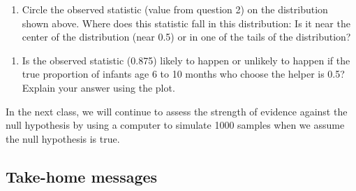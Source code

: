 \documentclass[
]{report}
\providecommand{\tightlist}{%
  \setlength{\itemsep}{0pt}\setlength{\parskip}{0pt}}
\begin{document}
\begin{enumerate}
\def\labelenumi{\arabic{enumi}.}
\setcounter{enumi}{16}
\tightlist
\item
  Circle the observed statistic (value from question 2) on the distribution shown above. Where does this statistic fall in this distribution: Is it near the center of the distribution (near 0.5) or in one of the tails of the distribution?
\end{enumerate}

\vspace{0.2in}

\begin{enumerate}
\def\labelenumi{\arabic{enumi}.}
\setcounter{enumi}{17}
\tightlist
\item
  Is the observed statistic (0.875) likely to happen or unlikely to happen if the true proportion of infants age 6 to 10 months who choose the helper is 0.5? Explain your answer using the plot.
\end{enumerate}

\vspace{0.8in}

In the next class, we will continue to assess the strength of evidence against the null hypothesis by using a computer to simulate 1000 samples when we assume the null hypothesis is true.

\hypertarget{take-home-messages-8}{%
\subsection{Take-home messages}\label{take-home-messages-8}}
\end{document}
